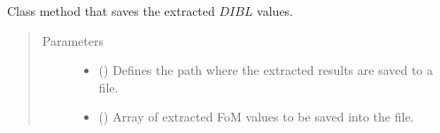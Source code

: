 \documentclass[letterpaper,10pt,english,openany, oneside]{sphinxmanual}
\begin{document}
\begin{fulllineitems}
\begin{fulllineitems}
\begin{quote}
\begin{description}
\begin{itemize}
\end{itemize}

\end{description}\end{quote}

\end{fulllineitems}


\begin{fulllineitems}
\label{\detokenize{index:fompy.fom.dibl_ext.save_results_to_file}}
Class method that saves the extracted \(DIBL\) values.
\begin{quote}\begin{description}
\item[{Parameters}] \leavevmode\begin{itemize}
\item {} 
 () \textendash{} Defines the path where the extracted results are saved to a file.

\item {} 
 () \textendash{} Array of extracted FoM values to be saved into the file.

\end{itemize}

\end{description}\end{quote}

\end{fulllineitems}


\end{fulllineitems}

\end{document}
